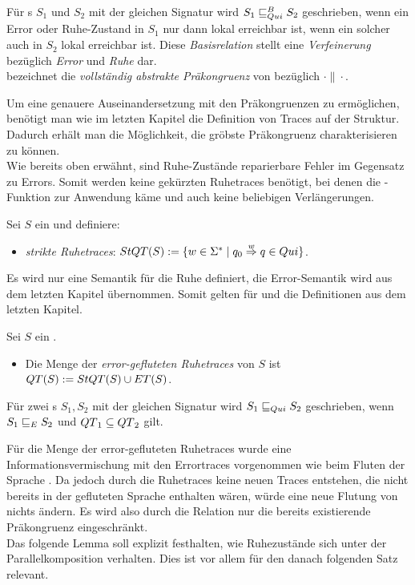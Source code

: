 \begin{Def}
\label{DefQuiBasisrel}
  Für \EIO{}s $S_1$ und $S_2$ mit der gleichen Signatur wird
  $S_1\sqsubseteq _{Qui}^B S_2$ geschrieben, wenn ein Error oder Ruhe-Zustand in $S_1$ nur
  dann lokal erreichbar ist, wenn ein solcher auch in $S_2$ lokal erreichbar
  ist. Diese \emph{Basisrelation} stellt eine \emph{Verfeinerung} bezüglich
  \emph{Error} und \emph{Ruhe} dar.\\
  \QCRel{} bezeichnet die \emph{vollständig abstrakte Präkongruenz} von
  \QBRel{} bezüglich $\cdot\|\cdot$.
\end{Def}

Um eine genauere Auseinandersetzung mit den Präkongruenzen zu ermöglichen,
benötigt man wie im letzten Kapitel die Definition von Traces auf der Struktur.
Dadurch erhält man die Möglichkeit, die gröbste Präkongruenz charakterisieren zu
können.\\
Wie bereits oben erwähnt, sind Ruhe-Zustände reparierbare Fehler im Gegensatz
zu Errors. Somit werden keine gekürzten Ruhetraces benötigt, bei denen die
\prune{}-Funktion zur Anwendung käme und auch keine beliebigen Verlängerungen.

\begin{Def}[Ruhetraces]
\label{DefRuhetraces}
  Sei $S$ ein \EIO{} und definiere:
  \begin{itemize}
    \item \emph{strikte Ruhetraces}: $StQT{}(S) := \{w\in\Sigma ^*\mid q_0
      \overset{w}{\Rightarrow} q\in Qui\}$.
  \end{itemize}
\end{Def}

Es wird nur eine Semantik für die Ruhe definiert, die Error-Semantik wird aus
dem letzten Kapitel übernommen. Somit gelten für \ET{} und \EL{} die
Definitionen aus dem letzten Kapitel.

\begin{Def}
\label{DefQTQL}
  Sei $S$ ein \EIO{}.
  \begin{itemize}
    \item Die Menge der \emph{error-gefluteten Ruhetraces} von $S$ ist
      $QT{}(S) := StQT{}(S)\cup ET{}(S)$.
  \end{itemize}
  Für zwei \EIO{}s $S_1, S_2$ mit der gleichen Signatur wird
  $S_1\sqsubseteq _{Qui} S_2$ geschrieben, wenn $S_1\sqsubseteq _E S_2$ und $QT{}_1\subseteq
  QT{}_2$ gilt.
\end{Def}

Für die Menge der error-gefluteten Ruhetraces \QT{} wurde eine Informationsvermischung
mit den Errortraces vorgenommen wie beim Fluten der Sprache \EL{}. Da jedoch
durch die Ruhetraces keine neuen Traces entstehen, die nicht bereits in der
gefluteten Sprache \EL{} enthalten wären, würde eine neue Flutung von \EL{}
nichts ändern. Es wird also durch die Relation \QRel{} nur die
bereits existierende Präkongruenz \ERel{} eingeschränkt.\\
Das folgende Lemma soll explizit festhalten, wie Ruhezustände sich unter der
Parallelkomposition verhalten. Dies ist vor allem für den danach folgenden Satz
relevant.

